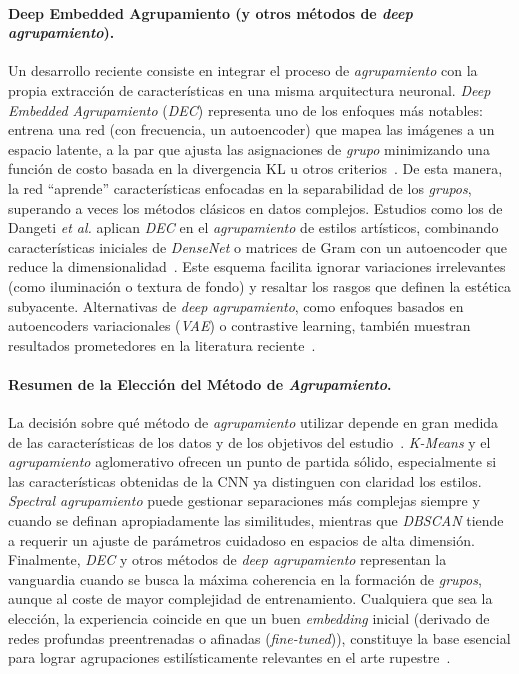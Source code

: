 \paragraph{Deep Embedded Agrupamiento (y otros métodos de \textit{deep agrupamiento}).}
Un desarrollo reciente consiste en integrar el proceso de \textit{agrupamiento} con la propia extracción de características en una misma arquitectura neuronal.
\textit{Deep Embedded Agrupamiento} (\textit{DEC}) representa uno de los enfoques más notables: entrena una red (con frecuencia, un autoencoder) que mapea las imágenes a un espacio latente, a la par que ajusta las asignaciones de \textit{grupo} minimizando una función de costo basada en la divergencia KL u otros criterios~\cite{dangeti2024}.
De esta manera, la red “aprende” características enfocadas en la separabilidad de los \textit{grupos}, superando a veces los métodos clásicos en datos complejos.
Estudios como los de Dangeti \textit{et al.} aplican \textit{DEC} en el \textit{agrupamiento} de estilos artísticos, combinando características iniciales de \textit{DenseNet} o matrices de Gram con un autoencoder que reduce la dimensionalidad~\cite{dangeti2024}.
Este esquema facilita ignorar variaciones irrelevantes (como iluminación o textura de fondo) y resaltar los rasgos que definen la estética subyacente.
Alternativas de \textit{deep agrupamiento}, como enfoques basados en autoencoders variacionales (\textit{VAE}) o contrastive learning, también muestran resultados prometedores en la literatura reciente~\cite{parisotto2022}.

\paragraph{Resumen de la Elección del Método de \textit{Agrupamiento}.}
La decisión sobre qué método de \textit{agrupamiento} utilizar depende en gran medida de las características de los datos y de los objetivos del estudio~\cite{dangeti2024}.
\textit{K-Means} y el \textit{agrupamiento} aglomerativo ofrecen un punto de partida sólido, especialmente si las características obtenidas de la CNN ya distinguen con claridad los estilos.
\textit{Spectral agrupamiento} puede gestionar separaciones más complejas siempre y cuando se definan apropiadamente las similitudes, mientras que \textit{DBSCAN} tiende a requerir un ajuste de parámetros cuidadoso en espacios de alta dimensión.
Finalmente, \textit{DEC} y otros métodos de \textit{deep agrupamiento} representan la vanguardia cuando se busca la máxima coherencia en la formación de \textit{grupos}, aunque al coste de mayor complejidad de entrenamiento.
Cualquiera que sea la elección, la experiencia coincide en que un buen \textit{embedding} inicial (derivado de redes profundas preentrenadas o afinadas (\textit{fine-tuned})), constituye la base esencial para lograr agrupaciones estilísticamente relevantes en el arte rupestre~\cite{guerin2018,gultepe2018,dangeti2024}.

